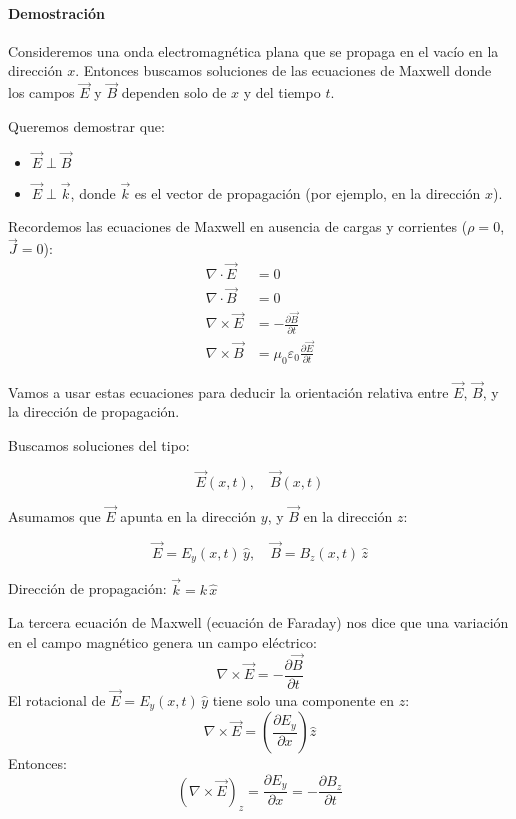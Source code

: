 \paragraph{Demostración}

Consideremos una onda electromagnética plana que se propaga en el vacío en la dirección \(x\). Entonces buscamos soluciones de las ecuaciones de Maxwell donde los campos \(\vec{E}\) y \(\vec{B}\) dependen solo de \(x\) y del tiempo \(t\).

Queremos demostrar que:
\begin{itemize}
  \item \(\vec{E} \perp \vec{B}\)
  \item \(\vec{E} \perp \vec{k}\), donde \(\vec{k}\) es el vector de propagación (por ejemplo, en la dirección \(x\)).
\end{itemize}

Recordemos las ecuaciones de Maxwell en ausencia de cargas y corrientes (\(\rho = 0\), \(\vec{J} = 0\)):
\begin{align*}
  \nabla \cdot \vec{E} &= 0 \\
  \nabla \cdot \vec{B} &= 0 \\
  \nabla \times \vec{E} &= -\frac{\partial \vec{B}}{\partial t} \\
  \nabla \times \vec{B} &= \mu_0 \varepsilon_0 \frac{\partial \vec{E}}{\partial t}
\end{align*}

Vamos a usar estas ecuaciones para deducir la orientación relativa entre \(\vec{E}\), \(\vec{B}\), y la dirección de propagación.

Buscamos soluciones del tipo:

\[
\vec{E}(x,t), \quad \vec{B}(x,t)
\]

Asumamos que \(\vec{E}\) apunta en la dirección \(y\), y \(\vec{B}\) en la dirección \(z\):

\[
\vec{E} = E_y(x,t)\, \hat{y}, \quad \vec{B} = B_z(x,t)\, \hat{z}
\]

Dirección de propagación: \(\vec{k} = k\, \hat{x}\)

La tercera ecuación de Maxwell (ecuación de Faraday) nos dice que una variación en el campo magnético genera un campo eléctrico:
\[
\nabla \times \vec{E} = -\frac{\partial \vec{B}}{\partial t}
\]
El rotacional de \(\vec{E} = E_y(x,t)\, \hat{y}\) tiene solo una componente en \(z\):
\[
\nabla \times \vec{E} = \left( \frac{\partial E_y}{\partial x} \right) \hat{z}
\]
Entonces:
\[
\left( \nabla \times \vec{E} \right)_z = \frac{\partial E_y}{\partial x} = -\frac{\partial B_z}{\partial t}
\]


